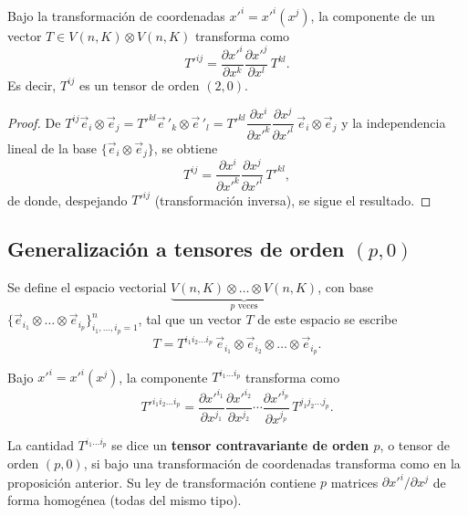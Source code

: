 \begin{proposicionc}
Bajo la transformación de coordenadas $x'^i=x'^i(x^j)$, la componente de
un vector $T\in V(n,K)\otimes V(n,K)$ transforma como
\[
T'^{ij} = \frac{\partial x'^i}{\partial x^k}\frac{\partial
x'^j}{\partial x^l}\, T^{kl} .
\]
Es decir, $T^{ij}$ es un tensor de orden $(2,0)$.
\end{proposicionc}

\begin{proof}
De $T^{ij}\vec e_i\otimes\vec e_j = T'^{kl}\vec e\,'_k\otimes\vec e\,'_l
= T'^{kl}\dfrac{\partial x^i}{\partial x'^k}\dfrac{\partial
x^j}{\partial x'^l}\, \vec e_i\otimes\vec e_j$ y la independencia lineal
de la base $\{\vec e_i\otimes\vec e_j\}$, se obtiene
\[
T^{ij} = \frac{\partial x^i}{\partial x'^k}\frac{\partial
x^j}{\partial x'^l}\, T'^{kl},
\]
de donde, despejando $T'^{ij}$ (transformación inversa), se sigue el
resultado. \qedhere
\end{proof}

\subsection{Generalización a tensores de orden \texorpdfstring{$(p,0)$}
{(p,0)}}

\begin{definicion}
Se define el espacio vectorial $\underbrace{V(n,K)\otimes\dots\otimes
V(n,K)}_{p\text{ veces}}$, con base $\{\vec e_{i_1}\otimes\dots\otimes
\vec e_{i_p}\}_{i_1,\dots,i_p=1}^n$, tal que un vector $T$ de este
espacio se escribe
\[
T = T^{i_1i_2\dots i_p}\, \vec e_{i_1}\otimes\vec e_{i_2}\otimes\dots
\otimes\vec e_{i_p}.
\]
\end{definicion}

\begin{proposicionc}
Bajo $x'^i=x'^i(x^j)$, la componente $T^{i_1\dots i_p}$ transforma como
\[
T'^{i_1i_2\dots i_p} = \frac{\partial x'^{i_1}}{\partial x^{j_1}}
\frac{\partial x'^{i_2}}{\partial x^{j_2}} \cdots \frac{\partial
x'^{i_p}}{\partial x^{j_p}}\, T^{j_1j_2\dots j_p}.
\]
\end{proposicionc}

\begin{definicion}
La cantidad $T^{i_1\dots i_p}$ se dice un \textbf{tensor contravariante
de orden $p$}, o tensor de orden $(p,0)$, si bajo una transformación de
coordenadas transforma como en la proposición anterior. Su ley de
transformación contiene $p$ matrices $\partial x'^i/\partial x^j$ de
forma homogénea (todas del mismo tipo).
\end{definicion}

